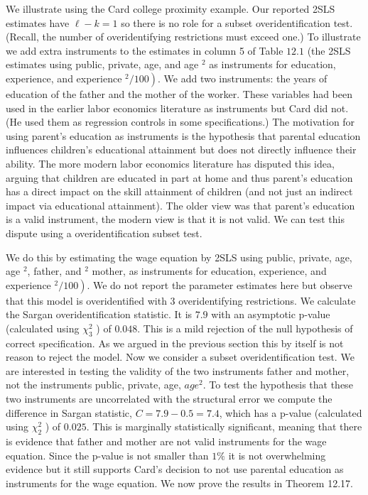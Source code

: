 \documentclass[10pt]{article}
\begin{document}
We illustrate using the Card college proximity example. Our reported 2SLS estimates have $\ell-k=1$ so there is no role for a subset overidentification test. (Recall, the number of overidentifying restrictions must exceed one.) To illustrate we add extra instruments to the estimates in column 5 of Table $12.1$ (the 2SLS estimates using public, private, age, and age ${ }^{2}$ as instruments for education, experience, and experience $\left.{ }^{2} / 100\right)$. We add two instruments: the years of education of the father and the mother of the worker. These variables had been used in the earlier labor economics literature as instruments but Card did not. (He used them as regression controls in some specifications.) The motivation for using parent's education as instruments is the hypothesis that parental education influences children's educational attainment but does not directly influence their ability. The more modern labor economics literature has disputed this idea, arguing that children are educated in part at home and thus parent's education has a direct impact on the skill attainment of children (and not just an indirect impact via educational attainment). The older view was that parent's education is a valid instrument, the modern view is that it is not valid. We can test this dispute using a overidentification subset test.

We do this by estimating the wage equation by 2SLS using public, private, age, age $^{2}$, father, and $^{2}$ mother, as instruments for education, experience, and experience $\left.{ }^{2} / 100\right)$. We do not report the parameter estimates here but observe that this model is overidentified with 3 overidentifying restrictions. We calculate the Sargan overidentification statistic. It is $7.9$ with an asymptotic p-value (calculated using $\chi_{3}^{2}$ ) of $0.048$. This is a mild rejection of the null hypothesis of correct specification. As we argued in the previous section this by itself is not reason to reject the model. Now we consider a subset overidentification test. We are interested in testing the validity of the two instruments father and mother, not the instruments public, private, age, $a g e^{2}$. To test the hypothesis that these two instruments are uncorrelated with the structural error we compute the difference in Sargan statistic, $C=7.9-0.5=7.4$, which has a p-value (calculated using $\chi_{2}^{2}$ ) of $0.025$. This is marginally statistically significant, meaning that there is evidence that father and mother are not valid instruments for the wage equation. Since the $\mathrm{p}$-value is not smaller than $1 \%$ it is not overwhelming evidence but it still supports Card's decision to not use parental education as instruments for the wage equation. We now prove the results in Theorem 12.17.
\end{document}
